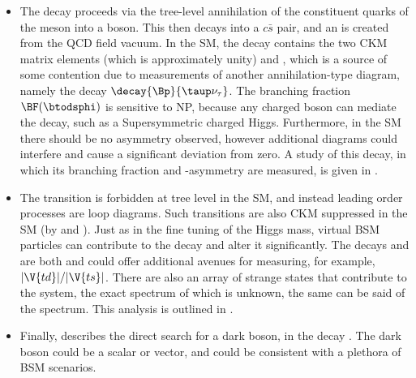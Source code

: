     \begin{itemize}
      \item
        The decay \btodsphi proceeds via the tree-level annihilation of the constituent quarks of the \Bp
        meson into a \Wp boson.
        This then decays into a $c\bar s$ pair, and an \ssbar is created from the QCD field vacuum.
        In the SM, the decay contains the two CKM matrix elements  (which is approximately unity) and
        , which is a source of some contention due to measurements of another
        annihilation-type diagram, namely the decay $\decay{\Bp}{\taup\nu_\tau}$.
        The branching fraction $\BF(\btodsphi)$ is sensitive to NP, because any charged boson can mediate
        the decay, such as a Supersymmetric charged Higgs.
        Furthermore, in the SM there should be no \CP asymmetry observed, however additional diagrams could
        interfere and cause a significant deviation from zero.
        A study of this decay, in which its branching fraction and \CP-asymmetry are measured, is given in
        .
      \item
        The \fcnc transition  is forbidden at tree level in the SM, and instead
        leading order processes are loop diagrams.
        Such transitions are also CKM suppressed in the SM (by  and ).
        Just as in the fine tuning of the Higgs mass, virtual BSM particles can contribute to the decay and
        alter it significantly.
        The decays \btokpipimumu and \btophikmumu are both   and could offer
        additional avenues for measuring, for example, $|\V{td}|/|\V{ts}|$.
        There are also an array of strange states that contribute to the \kpipi system, the exact
        spectrum of which is unknown, the same can be said of the \phik spectrum.
        This analysis is outlined in .
      \item
        Finally,  describes the direct search for a dark boson, \decay{\db}{\mumu} in the
        decay \decay{\Bd}{\Kstarent\mumu}.
        The dark boson could be a scalar or vector, and could be consistent with a plethora of BSM
        scenarios.
    \end{itemize}








